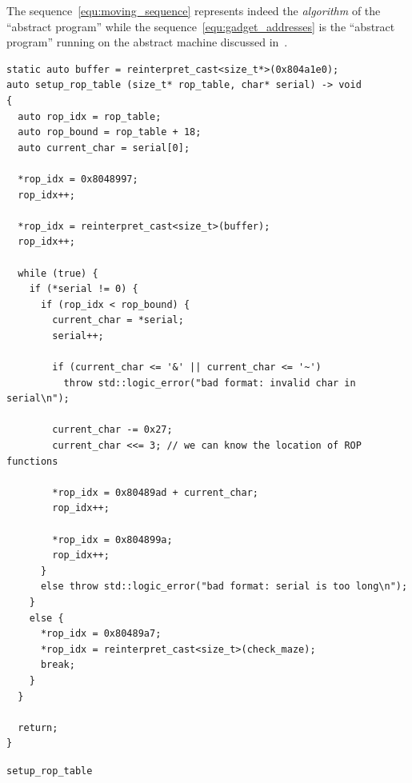 \documentclass{easychair}
\begin{document}
\begin{remark}
  The sequence~\ref{equ:moving_sequence} represents indeed the \emph{algorithm} of the ``abstract program'' while the sequence~\ref{equ:gadget_addresses} is the ``abstract program'' running on the abstract machine discussed in~.
\end{remark}

\begin{listing}[h]
  \begin{tcolorbox}
\begin{verbatim}
static auto buffer = reinterpret_cast<size_t*>(0x804a1e0);
auto setup_rop_table (size_t* rop_table, char* serial) -> void
{
  auto rop_idx = rop_table;
  auto rop_bound = rop_table + 18;
  auto current_char = serial[0];

  *rop_idx = 0x8048997;
  rop_idx++;

  *rop_idx = reinterpret_cast<size_t>(buffer);
  rop_idx++;

  while (true) {
    if (*serial != 0) {
      if (rop_idx < rop_bound) {
        current_char = *serial;
        serial++;

        if (current_char <= '&' || current_char <= '~')
          throw std::logic_error("bad format: invalid char in serial\n");

        current_char -= 0x27; 
        current_char <<= 3; // we can know the location of ROP functions

        *rop_idx = 0x80489ad + current_char;
        rop_idx++;

        *rop_idx = 0x804899a;
        rop_idx++;
      }
      else throw std::logic_error("bad format: serial is too long\n");
    }
    else {
      *rop_idx = 0x80489a7;
      *rop_idx = reinterpret_cast<size_t>(check_maze);
      break;
    }
  }

  return;
}
\end{verbatim}
  \end{tcolorbox}
  \caption{\texttt{setup\_rop\_table}}
  \label{lst:setup_rop_table}
\end{listing}
\end{document}
